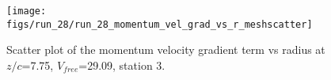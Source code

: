 \begin{figure}[H]
\centering
\texttt{[image: figs/run\_28/run\_28\_momentum\_vel\_grad\_vs\_r\_meshscatter]}
\caption{Scatter plot of the momentum velocity gradient term vs radius at $z/c$=7.75, $V_{free}$=29.09, station 3.}
\label{fig:run_28_momentum_vel_grad_vs_r_meshscatter}
\end{figure}


